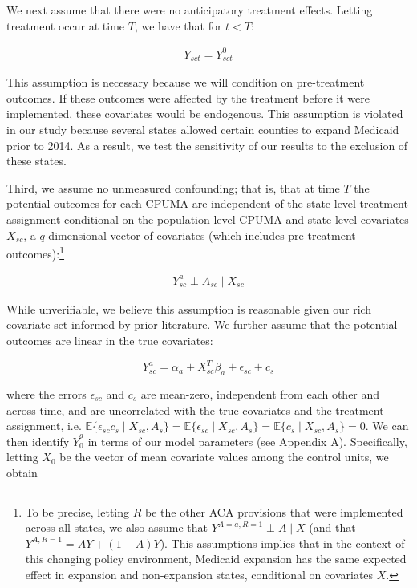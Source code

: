 \documentclass[aoas]{imsart}
\theoremstyle{plain}
\theoremstyle{remark}
\begin{document}
We next assume that there were no anticipatory treatment effects. Letting treatment occur at time $T$, we have that for $t < T$:

\begin{align*}
Y_{sct} = Y_{sct}^0
\end{align*}

This assumption is necessary because we will condition on pre-treatment outcomes. If these outcomes were affected by the treatment before it were implemented, these covariates would be endogenous. This assumption is violated in our study because several states allowed certain counties to expand Medicaid prior to 2014. As a result, we test the sensitivity of our results to the exclusion of these states.

Third, we assume no unmeasured confounding; that is, that at time $T$ the potential outcomes for each CPUMA are independent of the state-level treatment assignment conditional on the population-level CPUMA and state-level covariates $X_{sc}$, a $q$ dimensional vector of covariates (which includes pre-treatment outcomes):\footnote{To be precise, letting $R$ be the other ACA provisions that were implemented across all states, we also assume that $Y^{A = a, R = 1} \perp A \mid X$ (and that $Y^{A, R = 1} = AY + (1 - A)Y$). This assumptions implies that in the context of this changing policy environment, Medicaid expansion has the same expected effect in expansion and non-expansion states, conditional on covariates $X$.}

\begin{align*}
Y_{sc}^a \perp A_{sc} \mid X_{sc}
\end{align*}

While unverifiable, we believe this assumption is reasonable given our rich covariate set informed by prior literature. We further assume that the potential outcomes are linear in the true covariates:

\begin{equation}\label{eqn:outcomemodel}
Y_{sc}^a = \alpha_a + X_{sc}^T\beta_a + \epsilon_{sc} + c_s
\end{equation}

where the errors $\epsilon_{sc}$ and $c_s$ are mean-zero, independent from each other and across time, and are uncorrelated with the true covariates and the treatment assignment, i.e. $\mathbb{E}\{\epsilon_{sc}c_s \mid X_{sc}, A_s\} = \mathbb{E}\{\epsilon_{sc} \mid X_{sc}, A_s\} = \mathbb{E}\{c_s \mid X_{sc}, A_s\} = 0$. We can then identify $\bar{Y}^a_0$ in terms of our model parameters (see Appendix A). Specifically, letting $\bar{X}_0$ be the vector of mean covariate values among the control units, we obtain
\end{document}

